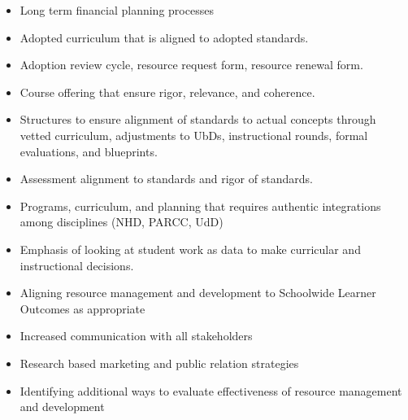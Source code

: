 
\begin{itemize}
\item Long term financial planning processes
\item Adopted curriculum that is aligned to adopted standards. 
\item Adoption review cycle, resource request form, resource renewal form.
\item Course offering that ensure rigor, relevance, and coherence. 
\item Structures to ensure alignment of standards to actual concepts through vetted curriculum, adjustments to UbDs, instructional rounds, formal evaluations, and blueprints. 
\item Assessment alignment to standards and rigor of standards. 
\item Programs, curriculum, and planning that requires authentic integrations among disciplines (NHD, PARCC, UdD) 
\item Emphasis of looking at student work as data to make curricular and instructional decisions.\end{itemize}


\begin{itemize}
\item Aligning resource management and development to Schoolwide Learner Outcomes as appropriate 
\item Increased communication with all stakeholders
\item Research based marketing and public relation strategies
\item Identifying additional ways to evaluate effectiveness of resource management and development
\end{itemize}
